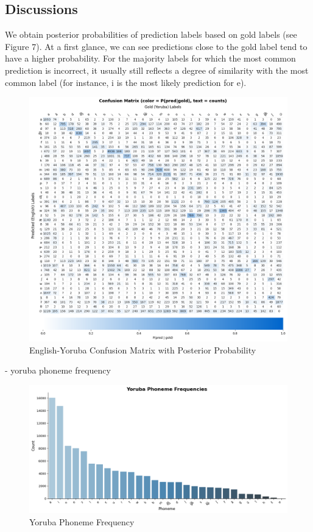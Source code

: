\documentclass[11pt]{article}
\begin{document}
{\subsection{Discussions}

We obtain posterior probabilities of prediction labels based on gold labels (see Figure 7). At a first glance, we can see predictions close to the gold label tend to have a higher probability. For the majority labels for which the most common prediction is incorrect, it usually still reflects a degree of similarity with the most common label (for instance, i is the most likely prediction for e).

\begin{figure}
    \centering
    \includegraphics[width=1\linewidth]{EngYorConfusionMatrix.png}
    \caption{English-Yoruba Confusion Matrix with Posterior Probability}
    \label{fig:placeholder}
\end{figure}

- yoruba phoneme frequency
\begin{figure}
    \centering
 \includegraphics[width=1\linewidth]{YorPhonemeFrequency.png}
    \caption{Yoruba Phoneme Frequency}
    \label{fig:placeholder}
\end{figure}



}
\end{document}
